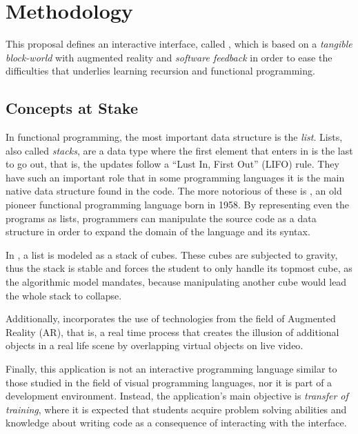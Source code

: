 
\section{Methodology}

This proposal defines an interactive interface, called \vestige, which
is based on a \emph{tangible block\hyp{}world} with augmented reality
and \emph{software feedback} in order to ease the difficulties that
underlies learning recursion and functional programming.

\subsection{Concepts at Stake}

In functional programming, the most important data structure is the
\emph{list}. Lists, also called \emph{stacks}, are a data type where
the first element that enters in is the last to go out, that is, the
updates follow a ``Lust In, First Out'' (LIFO) rule. They have such an
important role that in some programming languages it is the main
native data structure found in the code. The more notorious of these
is \lisp, an old pioneer functional programming language born in 1958.
By representing even the programs as lists, \lisp programmers can
manipulate the source code as a data structure in order to expand the
domain of the language and its syntax.

In \vestige, a list is modeled as a stack of cubes. These cubes are
subjected to gravity, thus the stack is stable and forces the student
to only handle its topmost cube, as the algorithmic model mandates,
because manipulating another cube would lead the whole stack to
collapse.

Additionally, \vestige incorporates the use of technologies from the
field of Augmented Reality (AR), that is, a real time process that
creates the illusion of additional objects in a real life scene by
overlapping virtual objects on live video.

Finally, this application is not an interactive programming language
similar to those studied in the field of visual programming languages,
nor it is part of a development environment. Instead, the
application's main objective is \emph{transfer of training}, where it
is expected that students acquire problem solving abilities and
knowledge about writing \erlang code as a consequence of interacting
with the interface.

